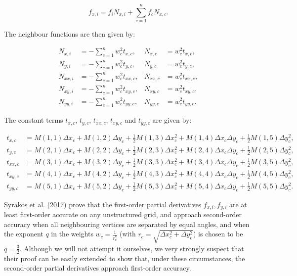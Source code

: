 \documentclass{article}
\begin{document}
\begin{equation} \label{eq:disc_LSNxi}
f_{x,i} = f_i N_{x,i} + \sum_{c=1}^n f_c N_{x,c}.
\end{equation}

The neighbour functions are then given by:

\begin{align} \label{eq:disc_LSNxi2}
N_{x,i} &= - \sum_{c=1}^n w_c^2 t_{x,c}, & N_{x,c} &= w_c^2 t_{x,c}, \\
N_{y,i} &= - \sum_{c=1}^n w_c^2 t_{y,c}, & N_{y,c} &= w_c^2 t_{y,c}, \\
N_{xx,i} &= - \sum_{c=1}^n w_c^2 t_{xx,c}, & N_{xx,c} &= w_c^2 t_{xx,c}, \\
N_{xy,i} &= - \sum_{c=1}^n w_c^2 t_{xy,c}, & N_{xy,c} &= w_c^2 t_{xy,c}, \\
N_{yy,i} &= - \sum_{c=1}^n w_c^2 t_{yy,c}, & N_{yy,c} &= w_c^2 t_{yy,c}.
\end{align}

The constant terms $t_{x,c}$, $t_{y,c}$, $t_{xx,c}$, $t_{xy,c}$ and $t_{yy,c}$ are given by:

\begin{align} \label{eq:disc_LStxty}
t_{x,c} &= M(1,1) \Delta x_c + M(1,2) \Delta y_c + \frac12 M(1,3) \Delta x_c^2 + M(1,4) \Delta x_c \Delta y_c + \frac12 M(1,5) \Delta y_c^2, \\
t_{y,c} &= M(2,1) \Delta x_c + M(2,2) \Delta y_c + \frac12 M(2,3) \Delta x_c^2 + M(2,4) \Delta x_c \Delta y_c + \frac12 M(2,5) \Delta y_c^2, \\
t_{xx,c} &= M(3,1) \Delta x_c + M(3,2) \Delta y_c + \frac12 M(3,3) \Delta x_c^2 + M(3,4) \Delta x_c \Delta y_c + \frac12 M(3,5) \Delta y_c^2, \\
t_{xy,c} &= M(4,1) \Delta x_c + M(4,2) \Delta y_c + \frac12 M(4,3) \Delta x_c^2 + M(4,4) \Delta x_c \Delta y_c + \frac12 M(4,5) \Delta y_c^2, \\
t_{yy,c} &= M(5,1) \Delta x_c + M(5,2) \Delta y_c + \frac12 M(5,3) \Delta x_c^2 + M(5,4) \Delta x_c \Delta y_c + \frac12 M(5,5) \Delta y_c^2.
\end{align}

Syrakos et al. (2017) prove that the first-order partial derivatives $f_{x,i}, f_{y,i}$ are at least first-order accurate on any unstructured grid, and approach second-order accuracy when all neighbouring vertices are separated by equal angles, and when the exponent $q$ in the weights $w_c = \frac{1}{r_c^q}$ (with $r_c = \sqrt{\Delta x_c^2 + \Delta y_c^2}$) is chosen to be $q = \frac32$. Although we will not attempt it ourselves, we very strongly suspect that their proof can be easily extended to show that, under these circumstances, the second-order partial derivatives approach first-order accuracy.
\end{document}
